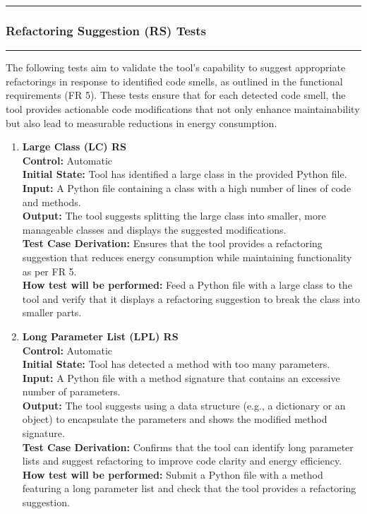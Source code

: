 \documentclass[12pt, titlepage]{article}
\newcommand{\colorrule}{\textcolor{BlueViolet}{\rule{\linewidth}{2pt}}}
\begin{document}
\noindent
\colorrule

\subsubsection{Refactoring Suggestion (RS) Tests}
\colorrule

\medskip

\noindent
The following tests aim to validate the tool's capability to suggest appropriate refactorings in response to identified code smells, as outlined in the functional requirements (FR 5). These tests ensure that for each detected code smell, the tool provides actionable code modifications that not only enhance maintainability but also lead to measurable reductions in energy consumption.
		
\begin{enumerate}[label={\bf \textcolor{Maroon}{test-FR-RS-\arabic*}}, wide=0pt, font=\itshape]
  \item \textbf{Large Class (LC) RS}\\[2mm]
    \textbf{Control:} Automatic \\
    \textbf{Initial State:} Tool has identified a large class in the provided Python file.\\
    \textbf{Input:} A Python file containing a class with a high number of lines of code and methods.\\
    \textbf{Output:} The tool suggests splitting the large class into smaller, more manageable classes and displays the suggested modifications.\\[2mm]
    \textbf{Test Case Derivation:} Ensures that the tool provides a refactoring suggestion that reduces energy consumption while maintaining functionality as per FR 5.\\[2mm]
    \textbf{How test will be performed:} Feed a Python file with a large class to the tool and verify that it displays a refactoring suggestion to break the class into smaller parts.
  
  \item \textbf{Long Parameter List (LPL) RS}\\[2mm]
    \textbf{Control:} Automatic \\
    \textbf{Initial State:} Tool has detected a method with too many parameters.\\
    \textbf{Input:} A Python file with a method signature that contains an excessive number of parameters.\\
    \textbf{Output:} The tool suggests using a data structure (e.g., a dictionary or an object) to encapsulate the parameters and shows the modified method signature.\\[2mm]
    \textbf{Test Case Derivation:} Confirms that the tool can identify long parameter lists and suggest refactoring to improve code clarity and energy efficiency.\\[2mm]
    \textbf{How test will be performed:} Submit a Python file with a method featuring a long parameter list and check that the tool provides a refactoring suggestion.
  

\end{enumerate}
\end{document}
